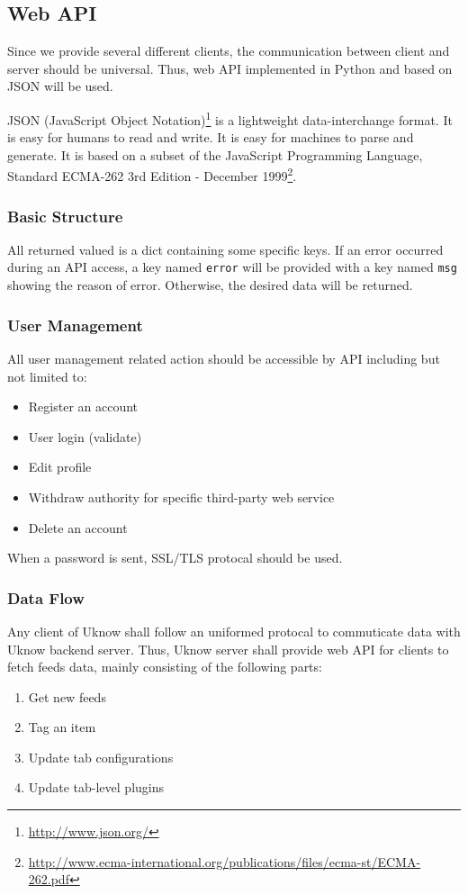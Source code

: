 \subsection{Web API}

\label{sec:webapi}
Since we provide several different clients, the communication between
client and server should be universal. Thus, web API implemented in Python and based on JSON will
be used.

JSON (JavaScript Object Notation)\footnote{\url{http://www.json.org/}} is a lightweight data-interchange
format. It is easy for humans to read and write. It is easy for machines
to parse and generate. It is based on a subset of the JavaScript
Programming Language, Standard ECMA-262 3rd Edition - December 1999\footnote{\url{http://www.ecma-international.org/publications/files/ecma-st/ECMA-262.pdf}}.

\subsubsection{Basic Structure}

All returned valued is a dict containing some specific keys. If an error
occurred during an API access, a key named \texttt{error} will be
provided with a key named \texttt{msg} showing the reason of error.
Otherwise, the desired data will be returned.

\subsubsection{User Management}

All user management related action should be accessible by API including
but not limited to:

\begin{itemize}
\itemsep1pt\parskip0pt
\item
  Register an account
\item
  User login (validate)
\item
  Edit profile
\item Withdraw authority for specific third-party web service
\item
  Delete an account
\end{itemize}

When a password is sent, SSL/TLS protocal should be used.

\subsubsection{Data Flow}
Any client of Uknow shall follow an uniformed protocal to commuticate data with Uknow backend server.
Thus, Uknow server shall provide web API for clients to fetch feeds data, mainly consisting of the following parts:
\begin{enumerate}
  \item Get new feeds
  \item Tag an item
  \item Update tab configurations
  \item Update tab-level plugins
\end{enumerate}


